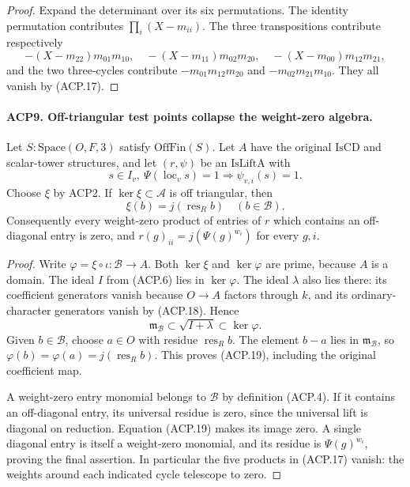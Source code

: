 \documentclass[11pt,a4paper]{article}
\numberwithin{equation}{section}
\theoremstyle{remark}\newtheorem{remark}[theorem]{Remark}
\begin{document}
\begin{proof}
Expand the determinant over its six permutations.  The identity
permutation contributes \(\prod_i(X-m_{ii})\).  The three
transpositions contribute respectively
\[
 -(X-m_{22})m_{01}m_{10},\quad
 -(X-m_{11})m_{02}m_{20},\quad
 -(X-m_{00})m_{12}m_{21},
\]
and the two three-cycles contribute
\(-m_{01}m_{12}m_{20}\) and \(-m_{02}m_{21}m_{10}\).
They all vanish by (ACP.17).
\end{proof}

\paragraph{ACP9. Off-triangular test points collapse the weight-zero algebra.}
\label{claim:ACP9}
Let \(S:\mathrm{Space}(O,F,3)\) satisfy
\(\mathrm{OffFin}(S)\).  Let \(A\) have the original
\(\mathrm{IsCD}\) and scalar-tower structures, and let
\((r,\psi)\) be an \(\mathrm{IsLiftA}\) with
\[
 s\in I_v,\ \Psi(\operatorname{loc}_v s)=1
                         \Longrightarrow\psi_{v,i}(s)=1.
                                                        \tag{ACP.18}
\]
Choose \(\xi\) by ACP2.  If
\(\ker\xi\subset\mathcal A\) is off triangular, then
\[
 \xi(b)=j(\operatorname{res}_R b)\quad(b\in\mathcal B).
                                                        \tag{ACP.19}
\]
Consequently every weight-zero product of entries of \(r\)
which contains an off-diagonal entry is zero, and
\(r(g)_{ii}=j(\Psi(g)^{w_i})\) for every \(g,i\).

\begin{proof}
Write \(\varphi=\xi\circ\iota:\mathcal B\to A\).
Both \(\ker\xi\) and \(\ker\varphi\) are prime, because
\(A\) is a domain.  The ideal \(I\) from (ACP.6) lies in
\(\ker\varphi\).  The ideal \(\lambda\) also lies there:
its coefficient generators vanish because \(O\to A\) factors
through \(k\), and its ordinary-character generators vanish
by (ACP.18).  Hence
\[
 \mathfrak m_{\mathcal B}\subset\sqrt{I+\lambda}
                                      \subset\ker\varphi.
\]
Given \(b\in\mathcal B\), choose \(a\in O\) with residue
\(\operatorname{res}_R b\).  The element \(b-a\) lies in
\(\mathfrak m_{\mathcal B}\), so
\(\varphi(b)=\varphi(a)=j(\operatorname{res}_R b)\).
This proves (ACP.19), including the original coefficient map.

A weight-zero entry monomial belongs to \(\mathcal B\) by
definition (ACP.4).  If it contains an off-diagonal entry,
its universal residue is zero, since the universal lift is
diagonal on reduction.  Equation (ACP.19) makes its image zero.
A single diagonal entry is itself a weight-zero monomial, and
its residue is \(\Psi(g)^{w_i}\), proving the final assertion.
In particular the five products in (ACP.17) vanish: the weights
around each indicated cycle telescope to zero.
\end{proof}
\end{document}
